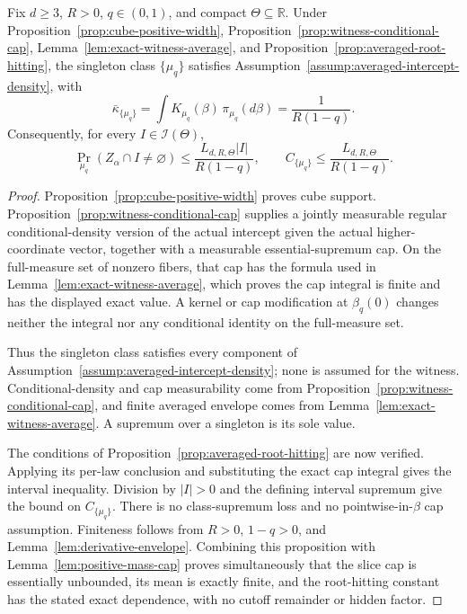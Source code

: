 \begin{proposition}
\label{prop:witness-root-hitting}
Fix $d\geq3$, $R>0$, $q\in(0,1)$, and compact
$\Theta\subseteq\mathbb R$.  Under
Proposition~\ref{prop:cube-positive-width},
Proposition~\ref{prop:witness-conditional-cap},
Lemma~\ref{lem:exact-witness-average}, and
Proposition~\ref{prop:averaged-root-hitting}, the singleton class
$\{\mu_q\}$ satisfies
Assumption~\ref{assump:averaged-intercept-density}, with
\[
\bar\kappa_{\{\mu_q\}}
=\int K_{\mu_q}(\beta)\,\pi_{\mu_q}(d\beta)
=\frac{1}{R(1-q)}.
\]
Consequently, for every $I\in\mathscr I(\Theta)$,
\[
\Pr_{\mu_q}(Z_\alpha\cap I\neq\varnothing)
\leq\frac{L_{d,R,\Theta}|I|}{R(1-q)},
\qquad
C_{\{\mu_q\}}
\leq\frac{L_{d,R,\Theta}}{R(1-q)}.
\]
\end{proposition}

\begin{proof}
Proposition~\ref{prop:cube-positive-width} proves cube support.
Proposition~\ref{prop:witness-conditional-cap} supplies a jointly
measurable regular conditional-density version of the actual intercept
given the actual higher-coordinate vector, together with a measurable
essential-supremum cap.  On the full-measure set of nonzero fibers, that
cap has the formula used in Lemma~\ref{lem:exact-witness-average}, which
proves the cap integral is finite and has the displayed exact value.
A kernel or cap modification at $\beta_q(0)$ changes neither the integral
nor any conditional identity on the full-measure set.

Thus the singleton class satisfies every component of
Assumption~\ref{assump:averaged-intercept-density}; none is assumed for
the witness.  Conditional-density and cap measurability come from
Proposition~\ref{prop:witness-conditional-cap}, and finite averaged
envelope comes from Lemma~\ref{lem:exact-witness-average}.  A supremum
over a singleton is its sole value.

The conditions of Proposition~\ref{prop:averaged-root-hitting} are now
verified.  Applying its per-law conclusion and substituting the exact
cap integral gives the interval inequality.  Division by $|I|>0$ and
the defining interval supremum give the bound on $C_{\{\mu_q\}}$.  There
is no class-supremum loss and no pointwise-in-$\beta$ cap assumption.
Finiteness follows from $R>0$, $1-q>0$, and
Lemma~\ref{lem:derivative-envelope}.  Combining this proposition with
Lemma~\ref{lem:positive-mass-cap} proves simultaneously that the slice
cap is essentially unbounded, its mean is exactly finite, and the
root-hitting constant has the stated exact dependence, with no cutoff
remainder or hidden factor.
\end{proof}

